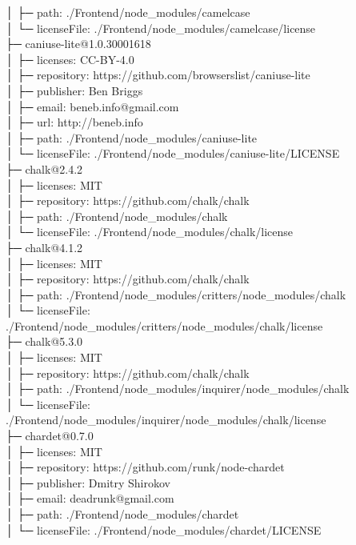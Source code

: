 │  ├─ path: ./Frontend/node\_modules/camelcase\\
│  └─ licenseFile: ./Frontend/node\_modules/camelcase/license\\
├─ caniuse-lite@1.0.30001618\\
│  ├─ licenses: CC-BY-4.0\\
│  ├─ repository: https://github.com/browserslist/caniuse-lite\\
│  ├─ publisher: Ben Briggs\\
│  ├─ email: beneb.info@gmail.com\\
│  ├─ url: http://beneb.info\\
│  ├─ path: ./Frontend/node\_modules/caniuse-lite\\
│  └─ licenseFile: ./Frontend/node\_modules/caniuse-lite/LICENSE\\
├─ chalk@2.4.2\\
│  ├─ licenses: MIT\\
│  ├─ repository: https://github.com/chalk/chalk\\
│  ├─ path: ./Frontend/node\_modules/chalk\\
│  └─ licenseFile: ./Frontend/node\_modules/chalk/license\\
├─ chalk@4.1.2\\
│  ├─ licenses: MIT\\
│  ├─ repository: https://github.com/chalk/chalk\\
│  ├─ path: ./Frontend/node\_modules/critters/node\_modules/chalk\\
│  └─ licenseFile: ./Frontend/node\_modules/critters/node\_modules/chalk/license\\
├─ chalk@5.3.0\\
│  ├─ licenses: MIT\\
│  ├─ repository: https://github.com/chalk/chalk\\
│  ├─ path: ./Frontend/node\_modules/inquirer/node\_modules/chalk\\
│  └─ licenseFile: ./Frontend/node\_modules/inquirer/node\_modules/chalk/license\\
├─ chardet@0.7.0\\
│  ├─ licenses: MIT\\
│  ├─ repository: https://github.com/runk/node-chardet\\
│  ├─ publisher: Dmitry Shirokov\\
│  ├─ email: deadrunk@gmail.com\\
│  ├─ path: ./Frontend/node\_modules/chardet\\
│  └─ licenseFile: ./Frontend/node\_modules/chardet/LICENSE\\
